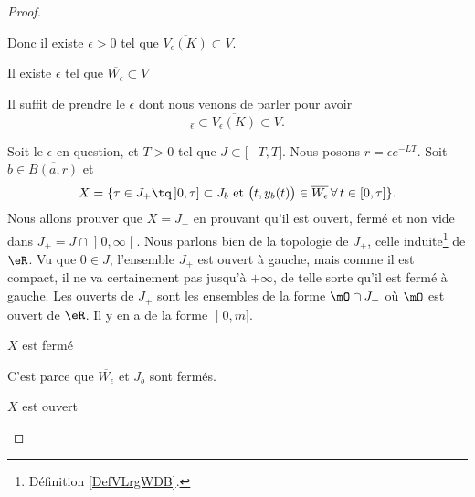 \begin{proof}
\begin{subproof}
        Donc il existe \( \epsilon>0\) tel que \( \overline{ V_{\epsilon}(K) }\subset V\).

    \item[Il existe \( \epsilon\) tel que \( \overline{ W_{\epsilon} }\subset V\)]

        Il suffit de prendre le \( \epsilon\) dont nous venons de parler pour avoir
        \begin{equation}
            \overline{ _{\epsilon} }\subset \overline{ V_{\epsilon}(K) }\subset V.
        \end{equation}
        
    \end{subproof}
    Soit le \( \epsilon\) en question, et \( T>0\) tel que \( J\subset \mathopen[ -T , T \mathclose]\). Nous posons \( r=\epsilon e^{-LT}\). Soit \( b\in \overline{ B(a,r) } \) et
    \begin{equation}
    X=\{ \tau\in J_{+}\tq\,\mathopen] 0 , \tau \mathclose]\subset J_b\text{ et }    \big( t,y_b(t) \big)\in \overline{ W_{\epsilon} }\,\forall\,t\in\mathopen[ 0 , \tau \mathclose]     \}.
    \end{equation}
Nous allons prouver que \( X=J_{+}\) en prouvant qu'il est ouvert, fermé et non vide dans \( J_+=J\cap\mathopen] 0 , \infty \mathclose[\). Nous parlons bien de la topologie de \( J_+\), celle induite\footnote{Définition \ref{DefVLrgWDB}.} de \( \eR\). Vu que \( 0\in J\), l'ensemble \( J_+\) est ouvert à gauche, mais comme il est compact, il ne va certainement pas jusqu'à \( +\infty\), de telle sorte qu'il est fermé à gauche. Les ouverts de \( J_+\) sont les ensembles de la forme \( \mO\cap J_+\) où \( \mO\) est ouvert de \( \eR\). Il y en a de la forme \( \mathopen] 0 , m \mathclose]\).

    \begin{subproof}
        \item[\( X\) est fermé] 

            C'est parce que \( \overline{ W_{\epsilon} }\) et \( J_b\) sont fermés.


        \item[\( X\) est ouvert] 


\end{subproof}
\end{proof}
